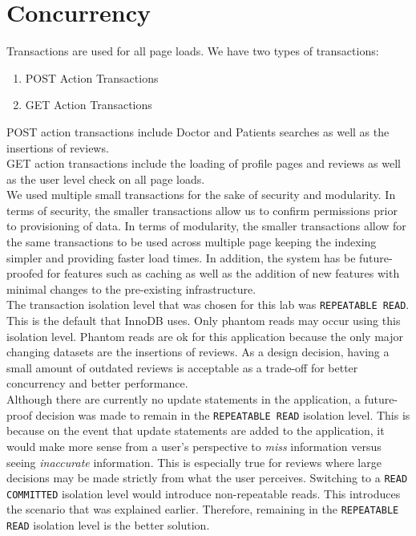 \documentclass{article}
\begin{document}
\section{Concurrency}
Transactions are used for all page loads. We have two types of transactions:
\begin{enumerate}
	\item POST Action Transactions
	\item GET Action Transactions
\end{enumerate}
POST action transactions include Doctor and Patients searches as well as the insertions of reviews. \\

GET action transactions include the loading of profile pages and reviews as well as the user level check on all page loads. \\

We used multiple small transactions for the sake of security and modularity. In terms of security, the smaller transactions allow us to confirm permissions prior to provisioning of data. In terms of modularity, the smaller transactions allow for the same transactions to be used across multiple page keeping the indexing simpler and providing faster load times. In addition, the system has be future-proofed for features such as caching as well as the addition of new features with minimal changes to the pre-existing infrastructure. \\

The transaction isolation level that was chosen for this lab was \texttt{REPEATABLE READ}. This is the default that InnoDB uses. Only phantom reads may occur using this isolation level. Phantom reads are ok for this application because the only major changing datasets are the insertions of reviews. As a design decision, having a small amount of outdated reviews is acceptable as a trade-off for better concurrency and better performance. \\

Although there are currently no update statements in the application, a future-proof decision was made to remain in the \texttt{REPEATABLE READ} isolation level. This is because on the event that update statements are added to the application, it would make more sense from a user's perspective to \textit{miss} information versus seeing \textit{inaccurate} information. This is especially true for reviews where large decisions may be made strictly from what the user perceives. Switching to a \texttt{READ COMMITTED} isolation level would introduce non-repeatable reads. This introduces the scenario that was explained earlier. Therefore, remaining in the \texttt{REPEATABLE READ} isolation level is the better solution.
\end{document}
